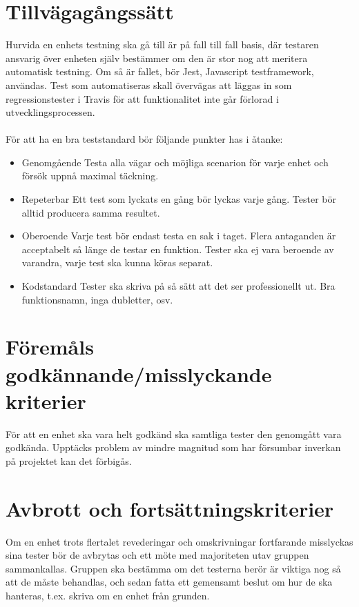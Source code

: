 \documentclass[10pt]{article}
\begin{document}
\section{Tillvägagångssätt}
	Hurvida en enhets testning ska gå till är på fall till fall basis, där testaren ansvarig över enheten själv bestämmer om den är stor nog att meritera automatisk testning.
	Om så är fallet, bör Jest, Javascript testframework, användas. Test som automatiseras skall övervägas att läggas in som regressionstester i Travis för att funktionalitet inte går förlorad i utvecklingsprocessen. \\
	\\
	För att ha en bra teststandard bör följande punkter has i åtanke:
	\begin {itemize}
	 \item [Genomgående] Testa alla vägar och möjliga scenarion för varje enhet och försök uppnå maximal täckning.
	 \item [Repeterbar] Ett test som lyckats en gång bör lyckas varje gång. Tester bör alltid producera samma resultet.
	 \item [Oberoende] Varje test bör endast testa en sak i taget. Flera antaganden är acceptabelt så länge de testar en funktion. Tester ska ej vara beroende av varandra, varje test ska kunna köras separat.
	 \item [Kodstandard] Tester ska skriva på så sätt att det ser professionellt ut. Bra funktionsnamn, inga dubletter, osv.
	\end {itemize}

	

\section{Föremåls godkännande/misslyckande kriterier}
	För att en enhet ska vara helt godkänd ska samtliga tester den genomgått vara godkända. Upptäcks problem av mindre magnitud som har försumbar inverkan på projektet kan det förbigås.



\section{Avbrott och fortsättningskriterier}
	Om en enhet trots flertalet revederingar och omskrivningar fortfarande misslyckas sina tester bör de avbrytas och ett möte med majoriteten utav gruppen sammankallas. 
	Gruppen ska bestämma om det testerna berör är viktiga nog så att de måste behandlas, och sedan fatta ett gemensamt beslut om hur de ska hanteras, t.ex. skriva om en enhet från grunden.
\end{document}
